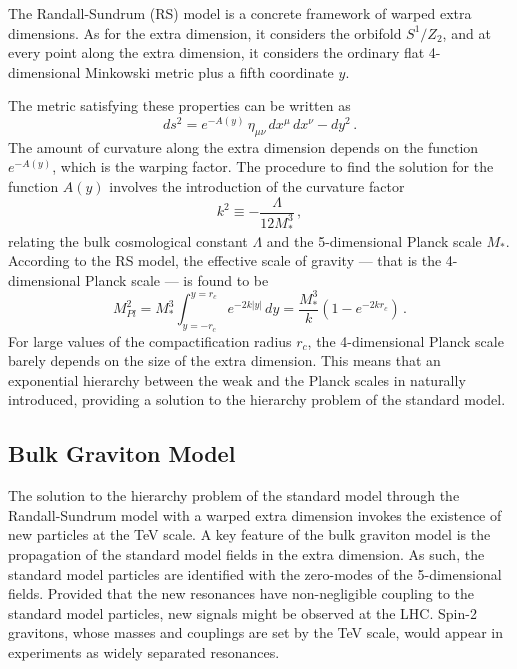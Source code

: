 The Randall-Sundrum (RS) model \cite{Randall:1999ee,Randall:1999vf} is a concrete framework of warped extra dimensions. As for the extra dimension, it considers the orbifold $S^1/Z_2$, and at every point along the extra dimension, it considers the ordinary flat 4-dimensional Minkowski metric plus a fifth coordinate $y$. 

The metric satisfying these properties can be written as
\begin{equation}
	ds^2 = e^{-A(y)} \, \eta_{\mu\nu} \, dx^\mu \, dx^\nu  - dy^2\,.
\end{equation}
The amount of curvature along the extra dimension depends on the function $e^{-A(y)}$, which is the warping factor. The procedure to find the solution for the function $A(y)$ involves the introduction of the curvature factor 
\begin{equation}
	k^2 \equiv -\frac{\Lambda}{12 M^3_*}\,,
\end{equation}
relating the bulk cosmological constant $\Lambda$ and the 5-dimensional Planck scale $M_*$. According to the RS model, the effective scale of gravity --- that is the 4-dimensional Planck scale --- is found to be
\begin{equation}
	M^2_{Pl} = M^3_* \int_{y=-r_c}^{y=r_c} e^{-2k|y|} \, dy = \frac{M^3_*}{k} \left(1 - e^{-2kr_c} \right) \,.
\end{equation}
For large values of the compactification radius $r_c$, the 4-dimensional Planck scale barely depends on the size of the extra dimension. This means that an exponential hierarchy between the weak and the Planck scales in naturally introduced, providing a solution to the hierarchy problem of the standard model.

\subsection{Bulk Graviton Model}
The solution to the hierarchy problem of the standard model through the Randall-Sundrum model with a warped extra dimension  invokes the existence of new particles at the TeV scale. A key feature of the bulk graviton model \cite{Agashe:2007zd} is the propagation of the standard model fields in the extra dimension. As such, the standard model particles are identified with the zero-modes of the 5-dimensional fields. Provided that the new resonances have non-negligible coupling to the standard model particles, new signals might be observed at the LHC. Spin-2 gravitons, whose masses and couplings are set by the TeV scale, would appear in experiments as widely separated resonances. 

